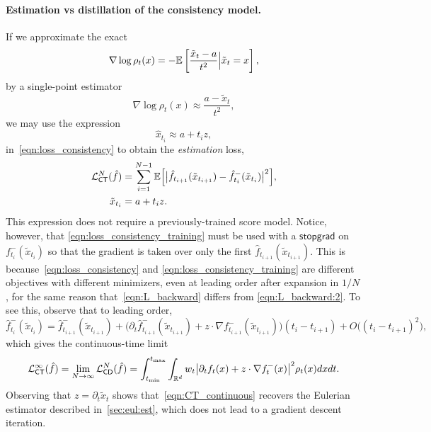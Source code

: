 \paragraph{Estimation vs distillation of the consistency model.}
If we approximate the exact
\begin{equation}
	\label{eqn:score_exact_ve}
	\nabla\log\rho_t(x) = -\mathbb{E}\left[\frac{\tilde x_t - a}{t^2} \Big| \tilde x_{t} = x\right],
\end{equation}
by a single-point estimator
\begin{equation}
	\label{eqn:score_approx_ve}
	\nabla\log\rho_t(x) \approx \frac{a - \tilde x_t}{t^2},
\end{equation}
we may use the expression
\begin{equation}
	\label{eqn:approx_xhat}
	\hat{x}_{t_i} \approx a + t_{i}z,
\end{equation}
in~\eqref{eqn:loss_consistency} to obtain the \textit{estimation} loss,
\begin{equation}
	\label{eqn:loss_consistency_training}
	\begin{aligned}
		\mathcal{L}_{\mathsf{CT}}^N(\hat f) & = \sum_{i=1}^{N-1}\mathbb{E}\Big[\big|\hat f_{t_{i+1}}(\tilde x_{t_{i+1}}) - \hat f^{-}_{t_i}(\tilde x_{t_i})\big|^2\Big], \\
		\tilde x_{t_i}                & = a + t_i z.
	\end{aligned}
\end{equation}
This expression does not require a previously-trained score model.
%
Notice, however, that \eqref{eqn:loss_consistency_training} must be used with a $\mathsf{stopgrad}$ on $f^-_{t_i}(\tilde x_{t_i})$ so that the gradient is taken over only the first $\hat f_{t_{i+1}}(\tilde x_{t_{i+1}})$.
%
This is because~\eqref{eqn:loss_consistency} and \eqref{eqn:loss_consistency_training} are different objectives with different minimizers, even at leading order after expansion in $1/N$, for the same reason that~\eqref{eqn:L_backward} differs from \eqref{eqn:L_backward:2}.
%
To see this, observe that to leading order,
\begin{equation}
	\label{eq:expand:fstop}
	\hat f^{-}_{t_i}(\tilde x_{t_i}) = \hat f^{-}_{t_{i+1}}(\tilde x_{t_{i+1}}) + \big( \partial_t \hat f^{-}_{t_{i+1}}(\tilde x_{t_{i+1}}) + z \cdot \nabla f^{-}_{t_{i+1}}(\tilde x_{t_{i+1}})\big) (t_{i}-t_{i+1}) + O\big((t_{i}-t_{i+1})^2\big),
\end{equation}
which gives the continuous-time limit
\begin{equation}
	\label{eqn:CT_continuous}
	\mathcal{L}^\infty_{\mathsf{CT}}(\hat f) = \lim_{N\to\infty} \mathcal{L}_{\mathsf{CD}}^N(\hat f) =\int_{t_{\min}}^{t_{\max}}\int_{\mathbb{R}^d} w_t \big|\partial_t f_t(x) + z \cdot \nabla f^-_t(x)\big|^2\rho_t(x)dxdt.
\end{equation}
Observing that $z = \partial_t \tilde{x}_t$ shows that~\eqref{eqn:CT_continuous} recovers the Eulerian estimator described in~\cref{sec:eul:est}, which does not lead to a gradient descent iteration.

